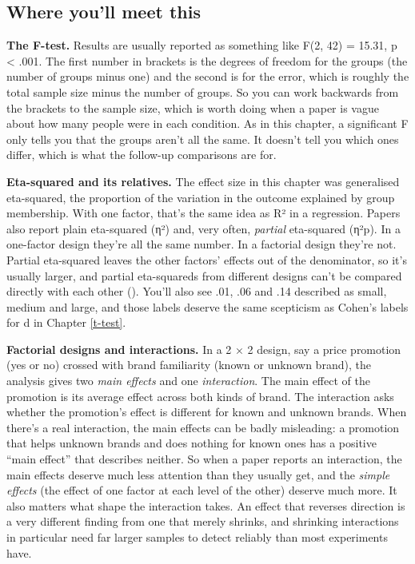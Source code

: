 \documentclass[
]{book}
\begin{document}
\subsection{Where you'll meet this}\label{where-youll-meet-this-8}

\textbf{The F-test.} Results are usually reported as something like F(2, 42) = 15.31, p \textless{} .001. The first number in brackets is the degrees of freedom for the groups (the number of groups minus one) and the second is for the error, which is roughly the total sample size minus the number of groups. So you can work backwards from the brackets to the sample size, which is worth doing when a paper is vague about how many people were in each condition. As in this chapter, a significant F only tells you that the groups aren't all the same. It doesn't tell you which ones differ, which is what the follow-up comparisons are for.

\textbf{Eta-squared and its relatives.} The effect size in this chapter was generalised eta-squared, the proportion of the variation in the outcome explained by group membership. With one factor, that's the same idea as R² in a regression. Papers also report plain eta-squared (η²) and, very often, \emph{partial} eta-squared (η²p). In a one-factor design they're all the same number. In a factorial design they're not. Partial eta-squared leaves the other factors' effects out of the denominator, so it's usually larger, and partial eta-squareds from different designs can't be compared directly with each other (). You'll also see .01, .06 and .14 described as small, medium and large, and those labels deserve the same scepticism as Cohen's labels for d in Chapter \ref{t-test}.

\textbf{Factorial designs and interactions.} In a 2 × 2 design, say a price promotion (yes or no) crossed with brand familiarity (known or unknown brand), the analysis gives two \emph{main effects} and one \emph{interaction}. The main effect of the promotion is its average effect across both kinds of brand. The interaction asks whether the promotion's effect is different for known and unknown brands. When there's a real interaction, the main effects can be badly misleading: a promotion that helps unknown brands and does nothing for known ones has a positive ``main effect'' that describes neither. So when a paper reports an interaction, the main effects deserve much less attention than they usually get, and the \emph{simple effects} (the effect of one factor at each level of the other) deserve much more. It also matters what shape the interaction takes. An effect that reverses direction is a very different finding from one that merely shrinks, and shrinking interactions in particular need far larger samples to detect reliably than most experiments have.
\end{document}
